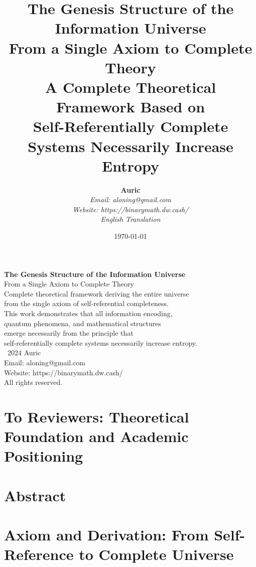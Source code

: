 \documentclass[12pt,a4paper]{book}
\title{
    \vspace{-2cm}
    \textbf{\Huge The Genesis Structure of the Information Universe}\\
    \vspace{1cm}
    \textbf{\Large From a Single Axiom to Complete Theory}\\
    \vspace{1cm}
    \textbf{\large A Complete Theoretical Framework Based on}\\
    \textbf{\large Self-Referentially Complete Systems Necessarily Increase Entropy}
}
\author{
    \textbf{Auric}\\
    \vspace{0.3cm}
    \textit{Email: aloning@gmail.com}\\
    \textit{Website: https://binarymath.dw.cash/}\\
    \vspace{0.3cm}
    \textit{English Translation}
}
\date{\today}
\theoremstyle{definition}
\theoremstyle{colored}
\begin{document}
\maketitle
\thispagestyle{empty}

\clearpage
\thispagestyle{empty}
\vspace*{\fill}
\begin{center}
\textbf{The Genesis Structure of the Information Universe}\\
From a Single Axiom to Complete Theory\\
\vspace{1cm}
Complete theoretical framework deriving the entire universe\\
from the single axiom of self-referential completeness.\\
\vspace{1cm}
This work demonstrates that all information encoding,\\
quantum phenomena, and mathematical structures\\
emerge necessarily from the principle that\\
self-referentially complete systems necessarily increase entropy.\\
\vspace{2cm}
\textcopyright\ 2024 Auric\\
Email: aloning@gmail.com\\
Website: https://binarymath.dw.cash/\\
All rights reserved.
\end{center}
\vspace*{\fill}

\clearpage
\tableofcontents

\clearpage
\chapter*{To Reviewers: Theoretical Foundation and Academic Positioning}


\clearpage
\chapter*{Abstract}


\mainmatter

\chapter{Axiom and Derivation: From Self-Reference to Complete Universe}
\label{ch:axiom}

\end{document}
